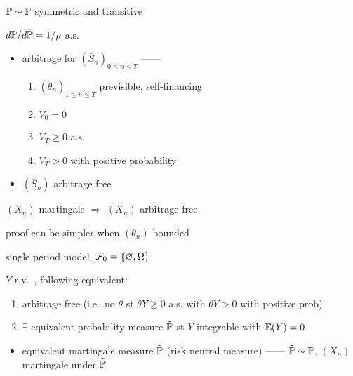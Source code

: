 \begin{fact}
    $\tilde {\mathbb{P}} \sim \mathbb{P}$ symmetric and transitive
\end{fact}

\begin{fact}
    $d\mathbb{P}/d\tilde{\mathbb{P}} = 1/\rho$ a.s.\
\end{fact}

\begin{itemize}
    \item arbitrage for $(\bar S_n)_{0\leq n \leq T}$ ------
    \begin{enumerate}
        \item $(\bar\theta_n)_{1 \leq n \leq T}$ previsible, self-financing
        \item $V_0 = 0$
        \item $V_T \geq 0$ a.s.
        \item $V_T > 0$ with positive probability
    \end{enumerate}
\end{itemize}

\begin{itemize}
    \item $(\bar S_n)$ arbitrage free
\end{itemize}

\begin{prop}
    $(X_n)$ martingale $\Rightarrow$ $(X_n)$ arbitrage free
\end{prop}

\begin{fact}
    proof can be simpler when $(\theta_n)$ bounded
\end{fact}

\begin{setting}
    single period model, $\mathcal{F}_0 = \left\{\varnothing, \Omega\right\}$
\end{setting}

\begin{prop}
    $Y$ r.v.\ , following equivalent:
    \begin{enumerate}
        \item arbitrage free (i.e.\ no $\theta$ st $\theta Y \geq 0$ a.s. with $\theta Y > 0$ with positive prob)
        \item $\exists$ equivalent probability measure $\tilde {\mathbb{P}}$ st $Y$ integrable with $\mathbb{E}(Y) = 0$
    \end{enumerate}
\end{prop}

\begin{itemize}
    \item equivalent martingale measure $\tilde {\mathbb{P}}$ (risk neutral measure) ------ $\tilde {\mathbb{P}} \sim \mathbb{P}$, $(X_n)$ martingale under $\tilde {\mathbb{P}}$
\end{itemize}

